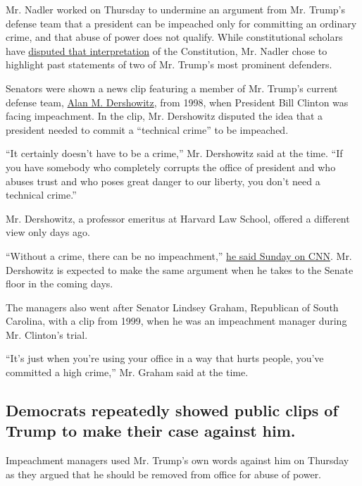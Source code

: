 Mr. Nadler worked on Thursday to undermine an argument from Mr. Trump's
defense team that a president can be impeached only for committing an
ordinary crime, and that abuse of power does not qualify. While
constitutional scholars have
\href{https://www.nytimes3xbfgragh.onion/2020/01/20/us/politics/trump-impeachment-legal-defense.html}{disputed
that interpretation} of the Constitution, Mr. Nadler chose to highlight
past statements of two of Mr. Trump's most prominent defenders.

Senators were shown a news clip featuring a member of Mr. Trump's
current defense team,
\href{https://www.nytimes3xbfgragh.onion/2020/01/17/us/politics/alan-dershowitz-trump.html}{Alan
M. Dershowitz}, from 1998, when President Bill Clinton was facing
impeachment. In the clip, Mr. Dershowitz disputed the idea that a
president needed to commit a ``technical crime'' to be impeached.

``It certainly doesn't have to be a crime,'' Mr. Dershowitz said at the
time. ``If you have somebody who completely corrupts the office of
president and who abuses trust and who poses great danger to our
liberty, you don't need a technical crime.''

Mr. Dershowitz, a professor emeritus at Harvard Law School, offered a
different view only days ago.

``Without a crime, there can be no impeachment,''
\href{http://transcripts.cnn.com/TRANSCRIPTS/2001/19/sotu.01.html}{he
said Sunday on CNN}. Mr. Dershowitz is expected to make the same
argument when he takes to the Senate floor in the coming days.

The managers also went after Senator Lindsey Graham, Republican of South
Carolina, with a clip from 1999, when he was an impeachment manager
during Mr. Clinton's trial.

``It's just when you're using your office in a way that hurts people,
you've committed a high crime,'' Mr. Graham said at the time.

\hypertarget{democrats-repeatedly-showed-public-clips-of-trump-to-make-their-case-against-him}{%
\subsection{Democrats repeatedly showed public clips of Trump to make
their case against
him.}\label{democrats-repeatedly-showed-public-clips-of-trump-to-make-their-case-against-him}}

Impeachment managers used Mr. Trump's own words against him on Thursday
as they argued that he should be removed from office for abuse of power.

